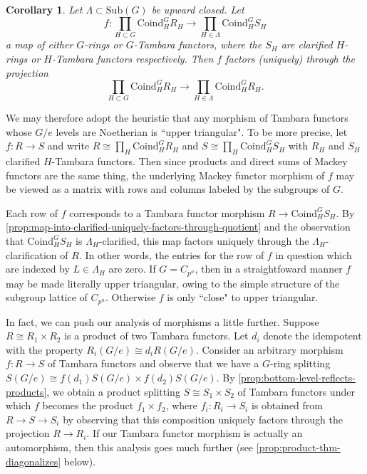 \documentclass[11pt,dvipsnames]{amsart}
\newtheorem{corollary}[theorem]{Corollary}
\theoremstyle{BoldRemark}
\begin{document}
\begin{corollary}\label{cor:no-Tamb-maps-which-decrease-coinduction}
	Let $\Lambda \subset \mathrm{Sub}(G)$ be upward closed. Let \[ f : \prod_{H \subset G} \mathrm{Coind}_H^G R_H \rightarrow \prod_{H \in \Lambda} \mathrm{Coind}_H^G S_H \] a map of either $G$-rings or $G$-Tambara functors, where the $S_H$ are clarified $H$-rings or $H$-Tambara functors respectively. Then $f$ factors (uniquely) through the projection \[ \prod_{H \subset G} \mathrm{Coind}_H^G R_H \rightarrow \prod_{H \in \Lambda} \mathrm{Coind}_H^G R_H . \]
\end{corollary}

We may therefore adopt the heuristic that any morphism of Tambara functors whose $G/e$ levels are Noetherian is ``upper triangular". To be more precise, let $f : R \rightarrow S$ and write $R \cong \prod_H \mathrm{Coind}_H^G R_H$ and $S \cong \prod_H \mathrm{Coind}_H^G S_H$ with $R_H$ and $S_H$ clarified $H$-Tambara functors. Then since products and direct sums of Mackey functors are the same thing, the underlying Mackey functor morphism of $f$ may be viewed as a matrix with rows and columns labeled by the subgroups of $G$.

Each row of $f$ corresponds to a Tambara functor morphism $R \rightarrow \mathrm{Coind}_H^G S_H$. By \cref{prop:map-into-clarified-uniquely-factors-through-quotient} and the observation that $\mathrm{Coind}_H^G S_H$ is $\Lambda_H$-clarified, this map factors uniquely through the $\Lambda_H$-clarification of $R$. In other words, the entries for the row of $f$ in question which are indexed by $L \in \Lambda_H$ are zero. If $G = C_{p^n}$, then in a straightfoward manner $f$ may be made literally upper triangular, owing to the simple structure of the subgroup lattice of $C_{p^n}$. Otherwise $f$ is only ``close" to upper triangular.

In fact, we can push our analysis of morphisms a little further. Suppose $R \cong R_1 \times R_2$ is a product of two Tambara functors. Let $d_i$ denote the idempotent with the property $R_i(G/e) \cong d_i R(G/e)$. Consider an arbitrary morphism $f : R \rightarrow S$ of Tambara functors and observe that we have a $G$-ring splitting $S(G/e) \cong f(d_1)S(G/e) \times f(d_2)S(G/e)$. By \cref{prop:bottom-level-reflects-products}, we obtain a product splitting $S \cong S_1 \times S_2$ of Tambara functors under which $f$ becomes the product $f_1 \times f_2$, where $f_i : R_i \rightarrow S_i$ is obtained from $R \rightarrow S \rightarrow S_i$ by observing that this composition uniquely factors through the projection $R \rightarrow R_i$. If our Tambara functor morphism is actually an automorphism, then this analysis goes much further (see \cref{prop:product-thm-diagonalizes} below).
\end{document}
